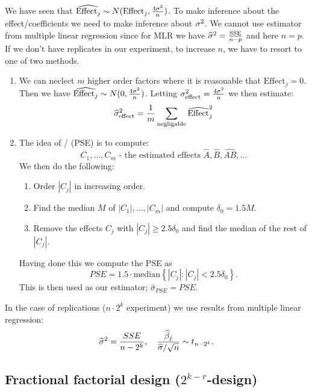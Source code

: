 We have seen that $\widehat{\textrm{Effect}_j} \sim N(\textrm{Effect}_j, \frac{4\sigma^2}{n})$. To make inference about the effect/coefficients we need to make inference about $\sigma^2$. We cannot use estimator from multiple linear regression since for MLR we have $\widehat{\sigma}^2=\frac{\textrm{SSE}}{n-p}$ and here $n=p$. If we don't have replicates in our experiment, to increase $n$, we have to resort to one of two methods.
\begin{enumerate}
    \item We can neclect $m$ higher order factors where it is reasonable that $\textrm{Effect}_j = 0$. Then we have $\widehat{\textrm{Effect}_j} \sim N(0, \frac{4\sigma^2}{n})$. Letting $\sigma^2_{\textrm{effect}} = \frac{4\sigma^2}{n}$ we then estimate:
    $$
        \widehat{\sigma}^2_{\textrm{effect}} = \frac{1}{m} \sum_{\textrm{negligable}} \widehat{\textrm{Effect}}_j^2
    $$

    \item The idea of  /  (PSE) is to compute:
    $$
        C_1, \ldots, C_m \text{ - the estimated effects } \hat{A}, \hat{B}, \hat{AB}, \ldots
    $$  
    We then do the following:
        \begin{enumerate}
            \item Order $|C_j|$ in increasing order.
            \item Find the median $M$ of $|C_1|, \ldots, |C_{m}|$ and compute $\delta_0 = 1.5M$.
            \item Remove the effects $C_j$ with $|C_j| \geq 2.5 \delta_0$ and find the median of the rest of $|C_j|$.
        \end{enumerate}
    Having done this we compute the PSE as 
    $$
        PSE = 1.5 \cdot \text{median} \left\{ |C_j| : |C_j| < 2.5 \delta_0 \right\}.
    $$
    This is then used as our estimator; $\hat{\sigma}_{PSE} = PSE$.
        
\end{enumerate}

In the case of replications ($n\cdot 2^k$ experiment) we use results from multiple linear regression:
$$
    \widehat{\sigma}^2 = \frac{SSE}{n-2^k}, \quad \frac{\widehat{\beta}_j}{\widehat{\sigma} / \sqrt{n}} \sim t_{n-2^k}.
$$


\subsection{Fractional factorial design ($2^{k-r}$-design)}

